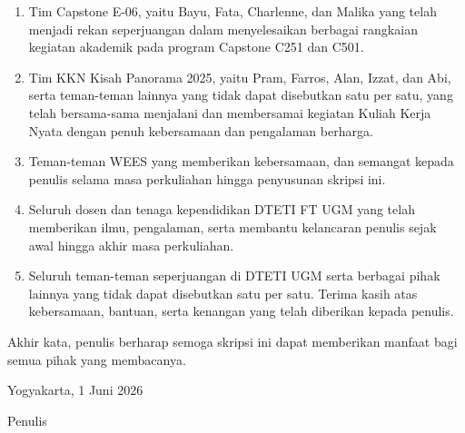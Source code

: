 \begin{enumerate}
  \item Tim Capstone E-06, yaitu Bayu, Fata, Charlenne, dan Malika yang
        telah menjadi rekan seperjuangan dalam menyelesaikan berbagai
        rangkaian kegiatan akademik pada program Capstone C251 dan C501.

  \item Tim KKN Kisah Panorama 2025, yaitu Pram, Farros, Alan, Izzat,
        dan Abi, serta teman-teman lainnya yang tidak dapat disebutkan
        satu per satu, yang telah bersama-sama menjalani dan membersamai
        kegiatan Kuliah Kerja Nyata dengan penuh kebersamaan dan
        pengalaman berharga.

  \item Teman-teman WEES yang memberikan kebersamaan, dan semangat kepada
        penulis selama masa perkuliahan hingga penyusunan skripsi ini.

  \item Seluruh dosen dan tenaga kependidikan DTETI FT UGM yang telah
        memberikan ilmu, pengalaman, serta membantu kelancaran penulis
        sejak awal hingga akhir masa perkuliahan.

  \item Seluruh teman-teman seperjuangan di DTETI UGM serta berbagai pihak
        lainnya yang tidak dapat disebutkan satu per satu. Terima kasih atas
        kebersamaan, bantuan, serta kenangan yang telah diberikan kepada
        penulis.

\end{enumerate}

Akhir kata, penulis berharap semoga skripsi ini dapat memberikan manfaat
bagi semua pihak yang membacanya.

\begin{flushright}
\vspace{\baselineskip}
Yogyakarta, 1 Juni 2026

\vspace{\baselineskip}
Penulis
\end{flushright}
